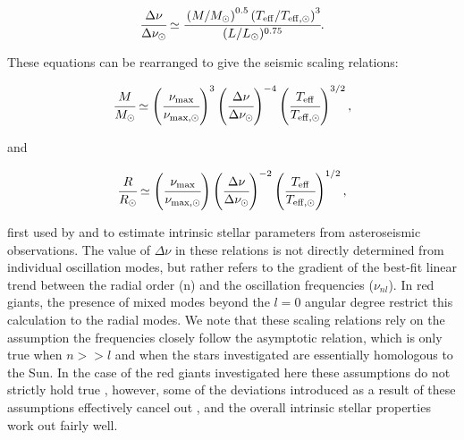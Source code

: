 \begin{equation}
    \cfrac{\Delta\nu}{\Delta\nu_{\odot}} \simeq \cfrac{\left(M/M_{\odot}\right)^{0.5}\left(T_{\mathrm{eff}}/T_{\mathrm{eff},\odot}\right)^{3}}{(L/L_{\odot})^{0.75}} .
    \label{eqtn:deltanu_scaling}
\end{equation}



\noindent These equations can be rearranged to give the seismic scaling relations:

\begin{equation}
    \cfrac{M}{M_{\odot}} \simeq \left(\cfrac{\nu_{\mathrm{max}}}{\nu_{\mathrm{max},\odot}}\right)^3 \left(\cfrac{\Delta\nu}{\Delta\nu_{\odot}}\right)^{-4}\left(\cfrac{T_{\mathrm{eff}}}{T_{\mathrm{eff},\odot}}\right)^{3/2} ,
    \label{eqtn:mass_scaling}
\end{equation}

\noindent and

\begin{equation}
    \cfrac{R}{R_{\odot}} \simeq \left(\cfrac{\nu_{\mathrm{max}}}{\nu_{\mathrm{max},\odot}}\right)\left(\cfrac{\Delta\nu}{\Delta\nu_{\odot}}\right)^{-2}\left(\cfrac{T_{\mathrm{eff}}}{T_{\mathrm{eff},\odot}}\right)^{1/2} ,
    \label{eqtn:radius_scaling}
\end{equation}


\noindent first used by \cite{stello_oscillating_2008} and \cite{kallinger_asteroseismology_2010} to estimate intrinsic stellar parameters from asteroseismic observations. The value of $\Delta\nu$ in these relations is not directly determined from individual oscillation modes, but rather refers to the gradient of the best-fit linear trend between the radial order (n) and the oscillation frequencies ($\nu_{nl}$). In red giants, the presence of mixed modes beyond the $l = 0$ angular degree restrict this calculation to the radial modes. We note that these scaling relations rely on the assumption the frequencies closely follow the asymptotic relation, which is only true when $n >> l$ and when the stars investigated are essentially homologous to the Sun. In the case of the red giants investigated here these assumptions do not strictly hold true \citep{mosser_asymptotic_2013, belkacem_seismic_2013}, however, some of the deviations introduced as a result of these assumptions effectively cancel out \citep{white_asteroseismology_2013}, and the overall intrinsic stellar properties work out fairly well.

